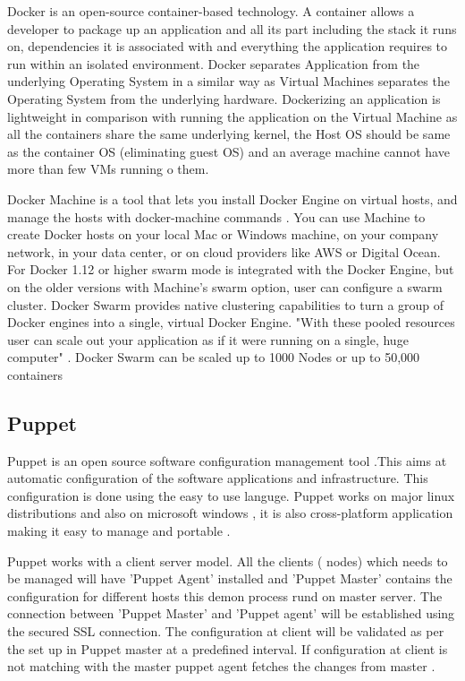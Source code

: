 {     Docker is an open-source container-based technology. A container
     allows a developer to package up an application and all its part
     including the stack it runs on, dependencies it is associated
     with and everything the application requires to run within an
     isolated environment. Docker separates Application from the
     underlying Operating System in a similar way as Virtual Machines
     separates the Operating System from the underlying
     hardware. Dockerizing an application is lightweight in comparison
     with running the application on the Virtual Machine as all the
     containers share the same underlying kernel, the Host OS should
     be same as the container OS (eliminating guest OS) and an average
     machine cannot have more than few VMs running o them.

     Docker Machine is a tool that lets you install Docker Engine on
     virtual hosts, and manage the hosts with docker-machine commands
     \cite{docker-book}. You can use Machine to create Docker hosts
     on your local Mac or Windows machine, on your company network, in
     your data center, or on cloud providers like AWS or Digital
     Ocean. For Docker 1.12 or higher swarm mode is integrated with
     the Docker Engine, but on the older versions with Machine's swarm
     option, user can configure a swarm cluster. Docker Swarm provides
     native clustering capabilities to turn a group of Docker engines
     into a single, virtual Docker Engine. "With these pooled
     resources user can scale out your application as if it were
     running on a single, huge computer" \cite{www-docker}. Docker
     Swarm can be scaled up to 1000 Nodes or up to 50,000 containers
     
\subsection{Puppet}

     Puppet is an open source software configuration management
     tool \cite{www-puppet-wiki-puppet}.This aims at automatic
     configuration of the software
     applications and infrastructure. This configuration is done
     using the easy to use languge.
     Puppet works on major linux distributions and also on
     microsoft windows ,
     it is also cross-platform application making it easy to manage
     and portable \cite{www-puppet-puppet-site}.

     Puppet works with a client server model. All the clients (
     nodes)  which needs to be managed will have 'Puppet Agent'
     installed and 'Puppet Master' contains the configuration for
     different hosts this demon process rund on master server. The
     connection between 'Puppet Master' and 'Puppet agent' will be
     established using the secured SSL connection. The configuration
     at client will be validated as per the set up in Puppet master
     at a predefined interval. If configuration at client is not
     matching with the master puppet agent fetches the 
     changes from master \cite{www-puppet-slashroot}.

}
